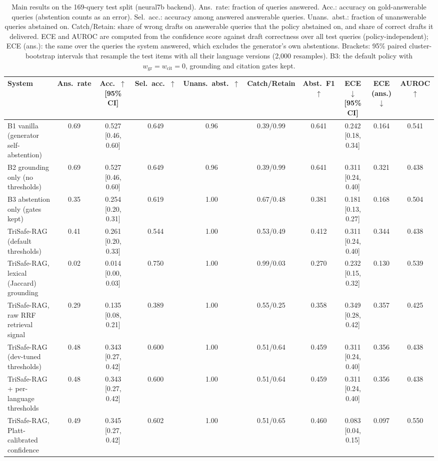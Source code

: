 \begin{table}[t]
  \caption{Main results on the 169-query test split (neural7b backend). Ans.\ rate: fraction of queries answered. Acc.: accuracy on gold-answerable queries (abstention counts as an error). Sel.\ acc.: accuracy among answered answerable queries. Unans.\ abst.: fraction of unanswerable queries abstained on. Catch/Retain: share of wrong drafts on answerable queries that the policy abstained on, and share of correct drafts it delivered. ECE and AUROC are computed from the confidence score against draft correctness over all test queries (policy-independent); ECE (ans.): the same over the queries the system answered, which excludes the generator's own abstentions. Brackets: 95\% paired cluster-bootstrap intervals that resample the test items with all their language versions (2{,}000 resamples). B3: the default policy with $w_{\mathrm{gr}}{=}w_{\mathrm{cit}}{=}0$, grounding and citation gates kept.}
  \label{tab:main-neural7b}
  \footnotesize
  \setlength{\tabcolsep}{2.5pt}
  \begin{tabular}{@{}lccccccccc@{}}
    \toprule
    System & Ans.\ rate & Acc.\ $\uparrow$ [95\% CI] & Sel.\ acc.\ $\uparrow$ & Unans.\ abst.\ $\uparrow$ & Catch/Retain & Abst.\ F1 $\uparrow$ & ECE $\downarrow$ [95\% CI] & ECE (ans.) $\downarrow$ & AUROC $\uparrow$ \\
    \midrule
    B1 vanilla (generator self-abstention) & 0.69 & 0.527 [0.46, 0.60] & 0.649 & 0.96 & 0.39/0.99 & 0.641 & 0.242 [0.18, 0.34] & 0.164 & 0.541 \\
    B2 grounding only (no thresholds) & 0.69 & 0.527 [0.46, 0.60] & 0.649 & 0.96 & 0.39/0.99 & 0.641 & 0.311 [0.24, 0.40] & 0.321 & 0.438 \\
    B3 abstention only (gates kept) & 0.35 & 0.254 [0.20, 0.31] & 0.619 & 1.00 & 0.67/0.48 & 0.381 & 0.181 [0.13, 0.27] & 0.168 & 0.504 \\
    TriSafe-RAG (default thresholds) & 0.41 & 0.261 [0.20, 0.33] & 0.544 & 1.00 & 0.53/0.49 & 0.412 & 0.311 [0.24, 0.40] & 0.344 & 0.438 \\
    TriSafe-RAG, lexical (Jaccard) grounding & 0.02 & 0.014 [0.00, 0.03] & 0.750 & 1.00 & 0.99/0.03 & 0.270 & 0.232 [0.15, 0.32] & 0.130 & 0.539 \\
    TriSafe-RAG, raw RRF retrieval signal & 0.29 & 0.135 [0.08, 0.21] & 0.389 & 1.00 & 0.55/0.25 & 0.358 & 0.349 [0.28, 0.42] & 0.357 & 0.425 \\
    TriSafe-RAG (dev-tuned thresholds) & 0.48 & 0.343 [0.27, 0.42] & 0.600 & 1.00 & 0.51/0.64 & 0.459 & 0.311 [0.24, 0.40] & 0.356 & 0.438 \\
    TriSafe-RAG + per-language thresholds & 0.48 & 0.343 [0.27, 0.42] & 0.600 & 1.00 & 0.51/0.64 & 0.459 & 0.311 [0.24, 0.40] & 0.356 & 0.438 \\
    TriSafe-RAG, Platt-calibrated confidence & 0.49 & 0.345 [0.27, 0.42] & 0.602 & 1.00 & 0.51/0.65 & 0.460 & 0.083 [0.04, 0.15] & 0.097 & 0.550 \\
    \bottomrule
  \end{tabular}
\end{table}
